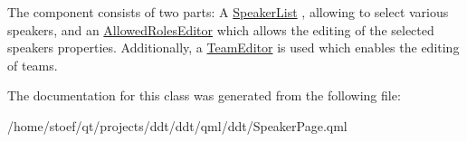 The component consists of two parts\-: A {\ttfamily \hyperlink{classSpeakerList}{Speaker\-List}} , allowing to select various speakers, and an {\ttfamily \hyperlink{classAllowedRolesEditor}{Allowed\-Roles\-Editor}} which allows the editing of the selected speakers properties. Additionally, a {\ttfamily \hyperlink{classTeamEditor}{Team\-Editor}} is used which enables the editing of teams. 

The documentation for this class was generated from the following file\-:\begin{DoxyCompactItemize}
\item 
/home/stoef/qt/projects/ddt/ddt/qml/ddt/Speaker\-Page.\-qml\end{DoxyCompactItemize}
